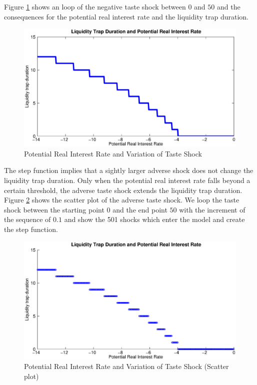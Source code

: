 \documentclass[12pt,a4paper,oneside,titlepage]{article}
\begin{document}
Figure \ref{Figure1b} shows an loop of the negative taste shock between $0$ and $50$ and the consequences for the potential real interest rate and the liquidity trap duration.
\begin{figure}[p]
\includegraphics[width=\textwidth]{Paperpics/Figure1b}
\caption{Potential Real Interest Rate and Variation of Taste Shock}
\label{Figure1b}
\end{figure}
The step function implies that a sightly larger adverse shock does not change the liquidity trap duration. Only when the potential real interest rate falls beyond a certain threshold, the adverse taste shock extends the liquidity trap duration. Figure \ref{Figure1bscatter} shows the scatter plot of the adverse taste shock. We loop the taste shock between the starting point $0$ and the end point $50$ with the increment of the sequence of $0.1$ and show the 501 shocks which enter the model and create the step function.
\begin{figure}[p]
\includegraphics[width=\textwidth]{Paperpics/Figure1bscatter}
\caption{Potential Real Interest Rate and Variation of Taste Shock (Scatter plot)}
\label{Figure1bscatter}
\end{figure}
\end{document}
